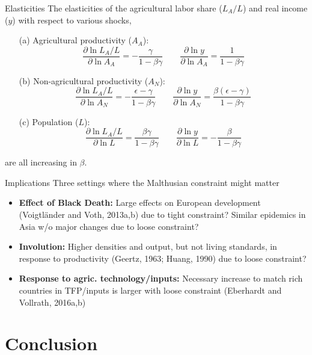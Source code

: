 \documentclass[10pt, xcolor=dvipsnames]{beamer}
\begin{document}
\begin{frame}{Elasticities}
The elasticities of the agricultural labor share ($L_A/L$) and real income ($y$) with respect to various shocks,
\begin{enumerate}
  \item[(a)] Agricultural productivity ($A_A$): 
\begin{equation}
  \frac{\partial \ln L_A/L}{\partial \ln A_A} = - \frac{\gamma}{1-\beta\gamma} \quad \quad \frac{\partial \ln y}{\partial \ln A_A} = \frac{1}{1-\beta\gamma}
\end{equation}
  \item[(b)] Non-agricultural productivity ($A_N$): 
\begin{equation}
  \frac{\partial \ln L_A/L}{\partial \ln A_N} = - \frac{\epsilon-\gamma}{1-\beta\gamma} \quad \quad \frac{\partial \ln y}{\partial \ln A_N} = \frac{\beta(\epsilon-\gamma)}{1-\beta\gamma}
\end{equation}
  \item[(c)] Population ($L$): 
\begin{equation}
  \frac{\partial \ln L_A/L}{\partial \ln L} = \frac{\beta\gamma}{1-\beta\gamma} \quad \quad \frac{\partial \ln y}{\partial \ln L} = - \frac{\beta}{1-\beta\gamma}
\end{equation}
\end{enumerate}
are all increasing in $\beta$.
\end{frame}

\begin{frame}{Implications}
Three settings where the Malthusian constraint might matter
\begin{itemize}
  \item \textbf{Effect of Black Death:} Large effects on European development (Voigtl{\"a}nder and Voth, 2013a,b) due to tight constraint? Similar epidemics in Asia w/o major changes due to loose constraint?
  \item \textbf{Involution:} Higher densities and output, but not living standards, in response to productivity (Geertz, 1963; Huang, 1990) due to loose constraint?
  \item \textbf{Response to agric. technology/inputs:} Necessary increase to match rich countries in TFP/inputs is larger with loose constraint (Eberhardt and Vollrath, 2016a,b)
\end{itemize}

\end{frame}
\section{Conclusion}
\end{document}
